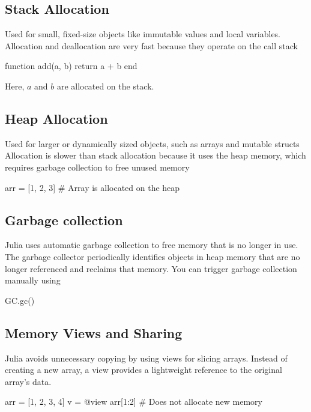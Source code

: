 \documentclass{report}
\begin{document}
     \subsection{Stack Allocation}
     \bigbreak \noindent 
     Used for small, fixed-size objects like immutable values and local variables. Allocation and deallocation are very fast because they operate on the call stack
     \bigbreak \noindent 
     \begin{jlcode}
         function add(a, b)
             return a + b
         end
     \end{jlcode}
     \bigbreak \noindent 
     Here, $a$ and $b$ are allocated on the stack.
     \bigbreak \noindent 
     \subsection{Heap Allocation}
     \bigbreak \noindent 
     Used for larger or dynamically sized objects, such as arrays and mutable structs
     Allocation is slower than stack allocation because it uses the heap memory, which requires garbage collection to free unused memory
     \bigbreak \noindent 
     \begin{jlcode}
     arr = [1, 2, 3]  # Array is allocated on the heap
     \end{jlcode}

     \bigbreak \noindent 
     \subsection{Garbage collection}
     \bigbreak \noindent 
     Julia uses automatic garbage collection to free memory that is no longer in use.
     The garbage collector periodically identifies objects in heap memory that are no longer referenced and reclaims that memory.
     \bigbreak \noindent 
     You can trigger garbage collection manually using
     \bigbreak \noindent 
     \begin{jlcode}
     GC.gc()
     \end{jlcode}

     \bigbreak \noindent 
     \subsection{Memory Views and Sharing}
     \bigbreak \noindent 
     Julia avoids unnecessary copying by using views for slicing arrays. Instead of creating a new array, a view provides a lightweight reference to the original array's data.
     \bigbreak \noindent 
     \begin{jlcode}
     arr = [1, 2, 3, 4]
     v = @view arr[1:2]  # Does not allocate new memory
     \end{jlcode}
\end{document}
